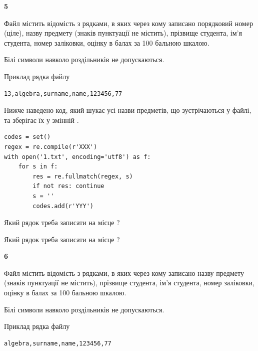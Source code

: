 \newpage

{\begin {center}\textbf{ 5}\end {center}}\par
Файл  містить відомість з рядками, в яких через кому записано поряд\-ковий номер (ціле), назву предмету (знаків пунктуації не містить), прізвище студента, ім'я студента, номер заліковки, оцінку в балах за 100 бальною шкалою.

Білі символи навколо роздільників не допускаються.

Приклад рядка файлу



\begin{verbatim}
13,algebra,surname,name,123456,77
\end{verbatim}


Нижче наведено код, який шукає усі назви предметів, що зустрічаються у файлі, та зберігає їх у змінній .



\begin{verbatim}
codes = set()
regex = re.compile(r'XXX')
with open('1.txt', encoding='utf8') as f:
    for s in f:
        res = re.fullmatch(regex, s)
        if not res: continue
        s = ''
        codes.add(r'YYY')
\end{verbatim}





Який рядок треба записати на місце  ?\par
\vspace{5mm}


Який рядок треба записати на місце  ?\par


\newpage

{\begin {center}\textbf{ 6}\end {center}}\par
Файл  містить відомість з рядками, в яких через кому записа\-но назву предмету (знаків пунктуації не містить), прізвище студента, ім'я студента, номер залі\-ков\-ки, оцінку в балах за 100 бальною шкалою.

Білі символи навколо роздільників не допускаються.

Приклад рядка файлу



\begin{verbatim}
algebra,surname,name,123456,77
\end{verbatim}


